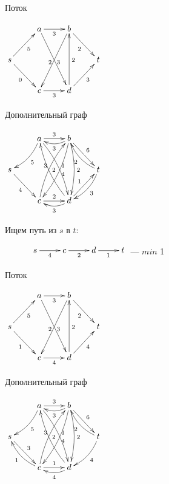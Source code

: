 \documentclass[a4paper, 12pt] {article}
\begin{document}
\newpage


Поток

$\begin{matrix}
	\xymatrix{
		& a  \ar@{->}[r]_3 \ar@{->}[rdd]_2 & b \ar@{->}[rd]_2 \\
		s \ar@{->}[rd]_0 \ar@{->}[ru]_5 &  & & t \\
		& c \ar@{->}[r]_3 \ar@{<-}[ruu]_3 & d \ar@{->}[ru]_3 \ar@{->}[uu]_2 \\
	}
\end{matrix}$

Дополнительный граф

$\begin{matrix}
	\xymatrix{
		& a  \ar@{->}[r]^3 \ar@/^/[ld]^5 \ar@/^/[rdd]^1  & b \ar@/^/[l]^3 \ar@{->}[rd]^6 \ar@/^/[ldd]^4 \ar@/^/[dd]^2 \\
		s \ar@{->}[rd]_4  &  & & t \ar@/^/[lu]^2 \ar@/^/[ld]^3\\
		& c \ar@{->}[r]^2 \ar@/^/[ruu]^3  & d \ar@/^/[l]^3 \ar@{->}[ru]^1 \ar@/^/[luu]_2 \\
	}
\end{matrix}$

Ищем путь из $ s $ в $ t :$

$\begin{matrix}
	\xymatrix{
		& s  \ar@{->}[r]_4 & c \ar@{->}[r]_2 & d \ar@{->}[r]_1 & t \\
	}
\end{matrix}$ --- $ min $ 1

Поток

$\begin{matrix}
	\xymatrix{
		& a  \ar@{->}[r]_3 \ar@{->}[rdd]_2 & b \ar@{->}[rd]_2 \\
		s \ar@{->}[rd]_1 \ar@{->}[ru]_5 &  & & t \\
		& c \ar@{->}[r]_4 \ar@{<-}[ruu]_3 & d \ar@{->}[ru]_4 \ar@{->}[uu]_2 \\
	}
\end{matrix}$

Дополнительный граф

$\begin{matrix}
	\xymatrix{
		& a  \ar@{->}[r]^3 \ar@/^/[ld]^5 \ar@/^/[rdd]^1  & b \ar@/^/[l]^3 \ar@{->}[rd]^6 \ar@/^/[ldd]^4 \ar@/^/[dd]^2 \\
		s \ar@{->}[rd]^3   &  & & t \ar@/^/[lu]^2 \ar@/^/[ld]^4\\
		& c \ar@{->}[r]^1 \ar@/^/[lu]^1 \ar@/^/[ruu]^3  & d \ar@/^/[l]^4  \ar@/^/[luu]_2 \\
	}
\end{matrix}$
\end{document}
